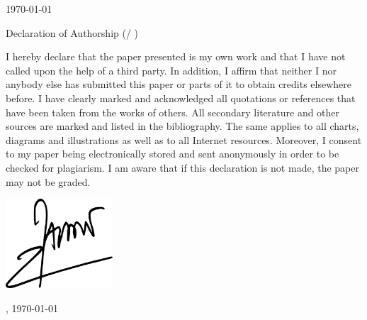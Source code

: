 \documentclass[
    12pt	%
    ]{article}
\begin{document}
  
\begin{titlepage}
\begin{center}

{\Large \EMBACourse}
\vspace{1cm}

{\large \EMBALecturer}
\vspace{2cm}

{\EMBATestType}

{\EMBAParticipant}

{\EMBAClass}

\vspace{1cm}

\today

\vspace{2.5cm}

Declaration of Authorship (\EMBACourse / \EMBATestType)
\vspace{0.5cm}
\end{center}


I hereby declare that the paper presented is my own work and that I
have not called upon the help of a third party. In addition, I affirm
that neither I nor anybody else has submitted this paper or parts of
it to obtain credits elsewhere before. I have clearly marked and
acknowledged all quotations or references that have been taken from
the works of others. All secondary literature and other sources are
marked and listed in the bibliography. The same applies to all charts,
diagrams and illustrations as well as to all Internet
resources. Moreover, I consent to my paper being electronically stored
and sent anonymously in order to be checked for plagiarism.  I am
aware that if this declaration is not made, the paper may not be
graded.

\vspace{1cm}

\begin{center}
\includegraphics[width=4cm] {img/signature.png}
\vspace{.1cm}

{\EMBAParticipant}

{\EMBALocation, \today}

\end{center}

\end{titlepage}
\end{document}
